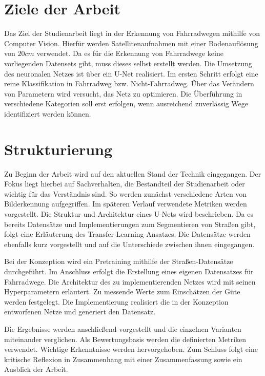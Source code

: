 \section{Ziele der Arbeit} \label{mot:ziele}
Das Ziel der Studienarbeit liegt in der Erkennung von Fahrradwegen mithilfe von Computer Vision.
Hierfür werden Satellitenaufnahmen mit einer Bodenauflösung von $20 cm$ verwendet.
Da es für die Erkennung von Fahrradwege keine vorliegenden Datensets gibt, muss dieses selbst erstellt werden.
Die Umsetzung des neuronalen Netzes ist über ein U-Net realisiert.
Im ersten Schritt erfolgt eine reine Klassifikation in Fahrradweg bzw. Nicht-Fahrradweg.
Über das Verändern von Parametern wird versucht, das Netz zu optimieren.
Die Überführung in verschiedene Kategorien soll erst erfolgen, wenn ausreichend zuverlässig Wege identifiziert werden können.

\section{Strukturierung} \label{mot:strukt}

Zu Beginn der Arbeit wird auf den aktuellen Stand der Technik eingegangen.
Der Fokus liegt hierbei auf Sachverhalten, die Bestandteil der Studienarbeit oder wichtig für das Verständnis sind.
So werden zunächst verschiedene Arten von Bilderkennung aufgegriffen.
Im späteren Verlauf verwendete Metriken werden vorgestellt.
Die Struktur und Architektur eines U-Nets wird beschrieben.
Da es bereits Datensätze und Implementierungen zum Segmentieren von Straßen gibt, folgt eine Erläuterung des Transfer-Learning-Ansatzes.
Die Datensätze werden ebenfalls kurz vorgestellt und auf die Unterschiede zwischen ihnen eingegangen.

Bei der Konzeption wird ein Pretraining mithilfe der Straßen-Datensätze durchgeführt.
Im Anschluss erfolgt die Erstellung eines eigenen Datensatzes für Fahrradwege.
Die Architektur des zu implementierenden Netzes wird mit seinen Hyperparametern erläutert.
Zu messende Werte zum Einschätzen der Güte werden festgelegt.
Die Implementierung realisiert die in der Konzeption entworfenen Netze und generiert den Datensatz.

Die Ergebnisse werden anschließend vorgestellt und die einzelnen Varianten miteinander verglichen.
Als Bewertungsbasis werden die definierten Metriken verwendet.
Wichtige Erkenntnisse werden hervorgehoben. Zum Schluss folgt eine kritische Reflexion in Zusammenhang mit einer Zusammenfassung sowie ein Ausblick der Arbeit.